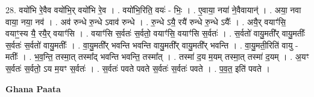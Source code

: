 \documentclass[17pt]{extarticle}
\begin{document}
28. वयो॑भि रे॒वैव वयो॑भि॒र् वयो॑भि रे॒व । . वयो॑भि॒रिति॒ वयः॑ - भिः॒ । . ए॒वाया॒ नया॑ ने॒वैवायान्॑ । . अया॒ नवा वाया॒ नया॒ नव॑ । . अव॑ रुन्धे रु॒न्धे ऽवाव॑ रुन्धे । . रु॒न्धे ऽयै॒ रयै॑ रुन्धे रु॒न्धे ऽयैः᳚ । . अयै॒र् वयाꣳ॑सि॒ वयाꣳ॒॒स्य यै॒ रयै॒र् वयाꣳ॑सि । . वयाꣳ॑सि स॒र्वतः॑ स॒र्वतो॒ वयाꣳ॑सि॒ वयाꣳ॑सि स॒र्वतः॑ । . स॒र्वतो॑ वायु॒मती᳚र् वायु॒मतीः᳚ स॒र्वतः॑ स॒र्वतो॑ वायु॒मतीः᳚ । . वा॒यु॒मती᳚र् भवन्ति भवन्ति वायु॒मती᳚र् वायु॒मती᳚र् भवन्ति । . वा॒यु॒मती॒रिति॑ वायु - मतीः᳚ । . भ॒व॒न्ति॒ तस्मा॒त् तस्मा᳚द् भवन्ति भवन्ति॒ तस्मा᳚त् । . तस्मा॑ द॒य म॒यम् तस्मा॒त् तस्मा॑ द॒यम् । . अ॒यꣳ स॒र्वतः॑ स॒र्वतो॒ ऽय म॒यꣳ स॒र्वतः॑ । . स॒र्वतः॑ पवते पवते स॒र्वतः॑ स॒र्वतः॑ पवते । . प॒व॒त॒ इति॑ पवते । \newline

\textbf{Ghana Paata } \newline
\end{document}
